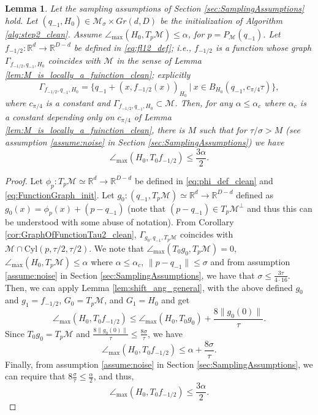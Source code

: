 \documentclass[12pt]{article}
\newtheorem{Lemma}[Theorem]{Lemma}
\theoremstyle{remark}
\newcommand{\RR}{\mathbb{R}}
\newcommand{\MM}{\mathcal{M}}
\newcommand{\maxangle}{\angle_{\max}}
\begin{document}
\begin{appendices}
\begin{Lemma}\label{lem:Tf_Tftilde_Init}
	Let the sampling assumptions of Section \ref{sec:SamplingAssumptions} hold.
	Let $(q_{-1}, H_0)\in \MM_\sigma\times Gr(d,D)$ be the initialization of Algorithm \ref{alg:step2_clean}. Assume $\maxangle (H_0, T_p\MM) \leq \alpha$, for $p = P_\MM(q_{-1})$.
	Let $ f_{-1/2}:\RR^d\to\RR^{D-d} $ be defined in \eqref{eq:fl12_def}; i.e., $f_{-1/2}$ is a function whose graph $ \Gamma_{f_{-1/2}, q_{-1}, H_0} $ coincides with $ \MM $ in the sense of Lemma \ref{lem:M_is_locally_a_fuinction_clean}; explicitly 
	\[
	\Gamma_{f_{-1/2}, q_{-1}, H_0} = \{q_{-1} + (x, f_{-1/2}(x))_{H_0} ~|~ x\in B_{H_0}(q_{-1}, c_{\pi/4}\tau)\}
	,\]
	where $c_{\pi/4}$ is a constant and $\Gamma_{f_{-1/2}, q_{-1}, H_0} \subset \MM$.
	Then, for any $\alpha \leq \alpha_c$ where $\alpha_c$ is a constant depending only on $c_{\pi/4}$ of Lemma \ref{lem:M_is_locally_a_fuinction_clean}, there is $M$ such that for $\tau/\sigma >M$ (see assumption \ref{assume:noise} in Section \ref{sec:SamplingAssumptions}) we have 
	\[
	\maxangle(H_0, T_0 f_{-1/2}) 
	\leq  \frac{3\alpha}{2}
	.\]
\end{Lemma}
\begin{proof}
    Let $\phi_p: T_p\MM \simeq \RR^d \rightarrow \RR^{D-d}$ be defined in \eqref{eq:phi_def_clean} and \eqref{eq:FunctionGraph_init}. Let $g_0:(q_{-1},T_p\MM) \simeq \RR^d \to \RR^{D-d}$ defined as $g_0(x) = \phi_p(x) + (p - q_{-1})$ (note that $ (p-q_{-1}) \in T_p \MM^\perp$ and thus this can be understood with some abuse of notation). From Corollary \ref{cor:GraphOfFunctionTau2_clean}, $\Gamma_{g_0, q_{-1}, T_p\MM}$ coincides with $\MM \cap \mathrm{Cyl}(p,\tau/2, \tau/2)$.
    We note that $\maxangle (T_0g_0, T_p\MM)=0$,  $\maxangle(H_0, T_p\MM)\leq \alpha$ where $\alpha \leq \alpha_c$, $\|p-q_{-1}\| \leq \sigma$ and from assumption \ref{assume:noise} in Section \ref{sec:SamplingAssumptions}, we have that $\sigma \leq \frac{3\tau}{4 \cdot 16}$.  
    Then, we can apply Lemma \ref{lem:shift_ang_general}, with the above defined $g_0$ and $g_1 = f_{-1/2}$, $G_0 = T_p\MM$, and $G_1 = H_0$ and get
    \[
    \maxangle (H_0, T_0f_{-1/2}) \leq \maxangle(H_0, T_0g_0)  + \frac{ 8\|g_0(0)\|}{\tau}
    .\]
Since $T_0g_0 = T_p\MM$ and $\frac{ 8\|g_0(0)\|}{\tau} \leq \frac{8\sigma}{\tau}$, we have 
\[
    \maxangle (H_0, T_0f_{-1/2}) \leq \alpha + \frac{8\sigma}{\tau}.
\]
Finally, from assumption \ref{assume:noise} in Section \ref{sec:SamplingAssumptions}, we can require that $8\frac{\sigma}{\tau}\leq \frac{\alpha}{2}$, and thus,
\[
    \maxangle (H_0, T_0f_{-1/2}) \leq \frac{3\alpha}{2}.
\]



\end{proof}
\end{appendices}
\end{document}
